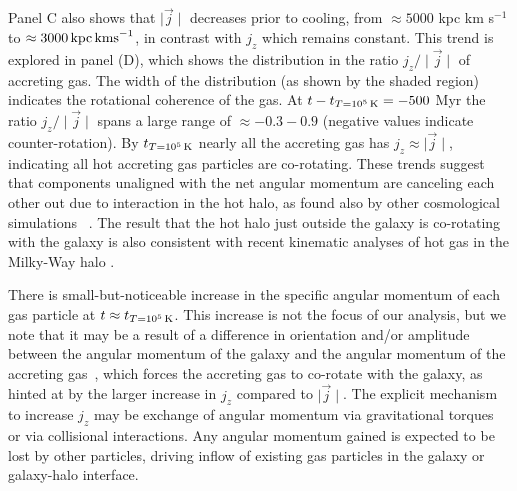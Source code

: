 \documentclass[fleqn,usenatbib]{mnras}
\newcommand{\tcon}{t_{T=10^5\,{\rm K}}}
\begin{document}
Panel C also shows that $\mid \vec j \mid$ decreases prior to cooling, from $\approx 5000$ kpc km s$^{-1}$ to $\approx 3000\,{\rm kpc\,km s}^{-1}$, in contrast with  $j_z$ which remains constant.
This trend is explored in  panel (D), which shows the distribution in the ratio $j_z/\mid\vec j\mid$ of accreting gas.
The width of the distribution (as shown by the shaded region) indicates the rotational coherence of the gas. 
At $t-\tcon=-500$ Myr the ratio $j_z/\mid\vec j\mid$ spans a large range of $\approx -0.3 - 0.9$ (negative values indicate counter-rotation).
By $\tcon$ nearly all the accreting gas has $j_z\approx\mid\vec j\mid$, indicating all hot accreting gas particles are co-rotating. 
These trends suggest that components unaligned with the net angular momentum are canceling each other out due to interaction in the hot halo, as found also by other cosmological simulations ~\citep[e.g.][]{DeFelippis2017}.
The result that the hot halo just outside the galaxy is co-rotating with the galaxy is also consistent with recent kinematic analyses of hot gas in the Milky-Way halo \citep{Miller2016}. 

There is small-but-noticeable increase in the specific angular momentum of each gas particle at $t \approx \tcon$.
This increase is not the focus of our analysis, but we note that it may be a result of a difference in orientation and/or amplitude between the angular momentum of the galaxy and the angular momentum of the accreting gas~\citep[e.g.][]{Danovich2012, DeFelippis2017, DeFelippis2020}, which forces the accreting gas to co-rotate with the galaxy, as hinted at by the larger increase in $j_z$ compared to $\mid \vec j \mid$.
The explicit mechanism to increase $j_z$ may be exchange of angular momentum via gravitational torques~\citep[e.g.][]{Danovich2015} or via collisional interactions.
Any angular momentum gained is expected to be lost by other particles, driving inflow of existing gas particles in the galaxy or galaxy-halo interface.
\end{document}
